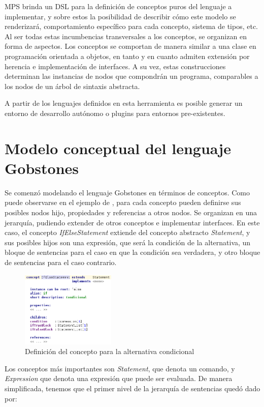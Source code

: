 MPS brinda un DSL para la definición de conceptos puros del lenguaje a implementar, y sobre estos la posibilidad de describir cómo este modelo se renderizará, comportamiento específico para cada concepto, sistema de tipos, etc. Al ser todas estas incumbencias transversales a los conceptos, se organizan en forma de aspectos.
Los conceptos se comportan de manera similar a una clase en programación orientada a objetos, en tanto y en cuanto admiten extensión por herencia e implementación de interfaces. A su vez, estas construcciones determinan las instancias de nodos que compondrán un programa, comparables a los nodos de un árbol de sintaxis abstracta.

A partir de los lenguajes definidos en esta herramienta es posible generar un entorno de desarrollo autónomo o plugins para entornos pre-existentes.

\section{Modelo conceptual del lenguaje Gobstones}\label{dominio}

Se comenzó modelando el lenguaje Gobstones en términos de conceptos. Como puede observarse en el ejemplo de , para cada concepto pueden definirse sus posibles nodos hijo, propiedades y referencias a otros nodos. Se organizan en una jerarquía, pudiendo extender de otros conceptos e implementar interfaces. En este caso, el concepto \textit{IfElseStatement} extiende del concepto abstracto \textit{Statement}, y sus posibles hijos son una expresión, que será la condición de la alternativa, un bloque de sentencias para el caso en que la condición sea verdadera, y otro bloque de sentencias para el caso contrario.

\begin{figure}[hb]
\centering
\includegraphics[width=0.4\textwidth]{assets/ifElse_concept}
\caption{Definición del concepto para la alternativa condicional}
\label{fig:ifElse_concept}
\end{figure}

Los conceptos más importantes son \textit{Statement}, que denota un comando, y \textit{Expression} que denota una expresión que puede ser evaluada. De manera simplificada, tenemos que el primer nivel de la jerarquía de sentencias quedó dado por:

